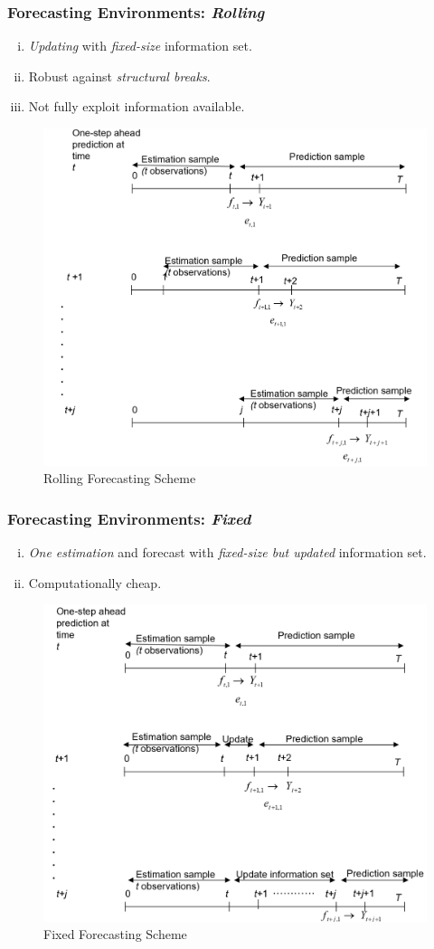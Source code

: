 \documentclass[11pt]{article}
\begin{document}
		\subsubsection{Forecasting Environments: \emph{Rolling}}
			\begin{enumerate}[(i)]
				\item \emph{Updating} with \emph{fixed-size} information set.
				\item Robust against \emph{structural breaks}.
				\item Not fully exploit information available.
			\end{enumerate}
			\begin{figure}[H]
				\centering
				\includegraphics[width=0.5\linewidth]{figures/rolling_forecast}
				\caption{Rolling Forecasting Scheme}
			\end{figure}
		\subsubsection{Forecasting Environments: \emph{Fixed}}
			\begin{enumerate}[(i)]
				\item \emph{One estimation} and forecast with \emph{fixed-size but updated} information set.
				\item Computationally cheap.
			\end{enumerate}
			\begin{figure}[H]
				\centering
				\includegraphics[width=0.5\linewidth]{figures/fixed_forecast}
				\caption{Fixed Forecasting Scheme}
			\end{figure}
\end{document}
